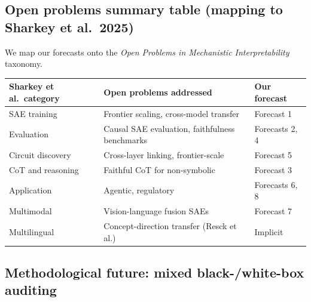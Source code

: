 \subsection{Open problems summary table (mapping to Sharkey et al.~2025)}\label{open-problems-summary-table-mapping-to-sharkey-et-al.-2025}

We map our forecasts onto the \emph{Open Problems in Mechanistic Interpretability} taxonomy.

{\def\LTcaptype{none} %
\begin{longtable}[]{@{}
  >{\raggedright\arraybackslash}p{}
  >{\raggedright\arraybackslash}p{}
  >{\raggedright\arraybackslash}p{}@{}}
\toprule\noalign{}
\begin{minipage}[b]{\linewidth}\raggedright
Sharkey et al.~category
\end{minipage} & \begin{minipage}[b]{\linewidth}\raggedright
Open problems addressed
\end{minipage} & \begin{minipage}[b]{\linewidth}\raggedright
Our forecast
\end{minipage} \\
\midrule\noalign{}
\endhead
\bottomrule\noalign{}
\endlastfoot
SAE training & Frontier scaling, cross-model transfer & Forecast 1 \\
Evaluation & Causal SAE evaluation, faithfulness benchmarks & Forecasts 2, 4 \\
Circuit discovery & Cross-layer linking, frontier-scale & Forecast 5 \\
CoT and reasoning & Faithful CoT for non-symbolic & Forecast 3 \\
Application & Agentic, regulatory & Forecasts 6, 8 \\
Multimodal & Vision-language fusion SAEs & Forecast 7 \\
Multilingual & Concept-direction transfer (Resck et al.) & Implicit \\
\end{longtable}
}

\subsection{Methodological future: mixed black-/white-box auditing}\label{methodological-future-mixed-black-white-box-auditing}


